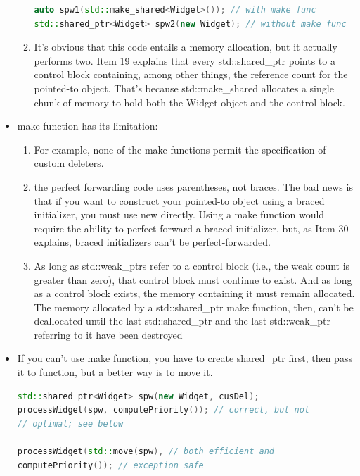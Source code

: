 \documentclass[a4paper,12pt,twoside]{book}
\begin{document}
\begin{itemize}
\begin{enumerate}
\begin{lstlisting}[frame=single, language=c++, mathescape=true]
auto spw1(std::make_shared<Widget>()); // with make func
std::shared_ptr<Widget> spw2(new Widget); // without make func
\end{lstlisting}

\item It's obvious that this code entails a memory allocation, but it actually performs two. Item 19 explains that every std::shared\_ptr points to a control block containing, among other things, the reference count for the pointed-to object. That's because std::make\_shared allocates a single chunk of
memory to hold both the Widget object and the control block.

\end{enumerate}

\item make function has its limitation:
\begin{enumerate}
\item For example, none of the make functions permit the specification of custom deleters.

\item the perfect forwarding code uses parentheses, not braces. The bad news is that if you want to construct your pointed-to object using a braced initializer, you must use new directly. Using a make function would require the ability to perfect-forward a braced initializer, but, as Item 30 explains, braced initializers can't be perfect-forwarded.

\item As long as std::weak\_ptrs refer to a control block (i.e., the weak count is greater
than zero), that control block must continue to exist. And as long as a control block
exists, the memory containing it must remain allocated. The memory allocated by a
std::shared\_ptr make function, then, can't be deallocated until the last
std::shared\_ptr and the last std::weak\_ptr referring to it have been destroyed
\end{enumerate}

\item If you can't use make function, you have to create shared\_ptr first, then pass it to function, but a better way is to move it.
\begin{lstlisting}[frame=single, language=c++]
std::shared_ptr<Widget> spw(new Widget, cusDel);
processWidget(spw, computePriority()); // correct, but not
// optimal; see below

processWidget(std::move(spw), // both efficient and
computePriority()); // exception safe
\end{lstlisting}

\end{itemize}
\end{document}
